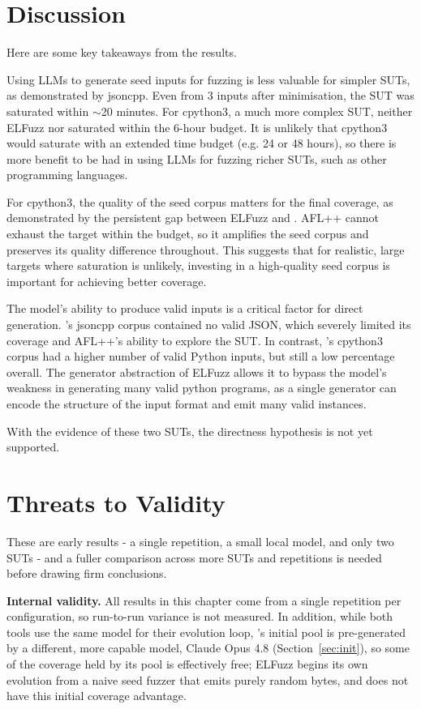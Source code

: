 \section{Discussion}
\label{sec:eval-discussion}

Here are some key takeaways from the results.

Using LLMs to generate seed inputs for fuzzing is less valuable for simpler SUTs, as demonstrated by jsoncpp. Even from 3 inputs after minimisation, the SUT was saturated within $\sim$20 minutes. For cpython3, a much more complex SUT, neither ELFuzz nor \toolname{} saturated within the 6-hour budget. It is unlikely that cpython3 would saturate with an extended time budget (e.g. 24 or 48 hours), so there is more benefit to be had in using LLMs for fuzzing richer SUTs, such as other programming languages.

For cpython3, the quality of the seed corpus matters for the final coverage, as demonstrated by the persistent gap between ELFuzz and \toolname{}. AFL++ cannot exhaust the target within the budget, so it amplifies the seed corpus and preserves its quality difference throughout. This suggests that for realistic, large targets where saturation is unlikely, investing in a high-quality seed corpus is important for achieving better coverage.

The model's ability to produce valid inputs is a critical factor for direct generation. \toolname{}'s jsoncpp corpus contained no valid JSON, which severely limited its coverage and AFL++'s ability to explore the SUT. In contrast, \toolname{}'s cpython3 corpus had a higher number of valid Python inputs, but still a low percentage overall. The generator abstraction of ELFuzz allows it to bypass the model's weakness in generating many valid python programs, as a single generator can encode the structure of the input format and emit many valid instances.

With the evidence of these two SUTs, the directness hypothesis is not yet supported.

\section{Threats to Validity}
\label{sec:eval-threats}

These are early results - a single repetition, a small local model, and only two SUTs - and a fuller comparison across more SUTs and repetitions is needed before drawing firm conclusions.

\textbf{Internal validity.} All results in this chapter come from a single repetition per configuration, so run-to-run variance is not measured. In addition, while both tools use the same model for their evolution loop, \toolname{}'s initial pool is pre-generated by a different, more capable model, Claude Opus 4.8 (Section~\ref{sec:init}), so some of the coverage held by its pool is effectively free; ELFuzz begins its own evolution from a naive seed fuzzer that emits purely random bytes, and does not have this initial coverage advantage.

